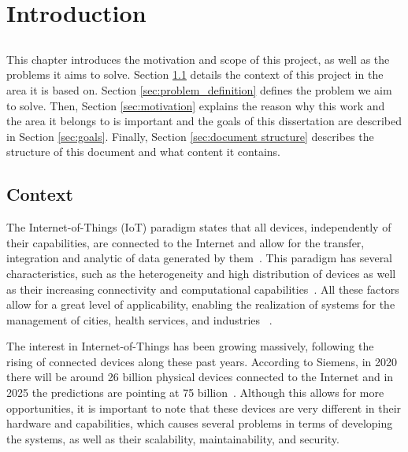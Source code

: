 \chapter{Introduction} \label{chap:intro} \minitoc

\section*{}

This chapter introduces the motivation and scope of this project, as well as the problems it aims to solve. Section \ref{sec:context} details the context of this project in the area it is based on. Section \ref{sec:problem_definition} defines the problem we aim to solve. Then, Section \ref{sec:motivation} explains the reason why this work and the area it belongs to is important and the goals of this dissertation are described in Section \ref{sec:goals}. Finally, Section \ref{sec:document structure} describes the structure of this document and what content it contains.

\section{Context} \label{sec:context}

The Internet-of-Things (IoT) paradigm states that all devices, independently of their capabilities, are connected to the Internet and allow for the transfer, integration and analytic of data generated by them~\cite{IoT_principles_and_paradigms}. This paradigm has several characteristics, such as the heterogeneity and high distribution of devices as well as their increasing connectivity and computational capabilities~\cite{SoS}. All these factors allow for a great level of applicability, enabling the realization of systems for the management of cities, health services, and industries ~\cite{6851114}.

The interest in Internet-of-Things has been growing massively, following the rising of connected devices along these past years. According to Siemens, in 2020 there will be around 26 billion physical devices connected to the Internet and in 2025 the predictions are pointing at 75 billion~\cite{tanweer}. Although this allows for more opportunities, it is important to note that these devices are very different in their hardware and capabilities, which causes several problems in terms of developing the systems, as well as their scalability, maintainability, and security. 

